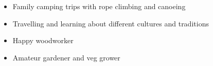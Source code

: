 \documentclass[10pt,a4paper,ragged2e,withhyper]{altacv}
\begin{document}
\begin{paracol}{2}


\divider



\begin{itemize}
    \item Family camping trips with rope climbing and canoeing
    
    \item Travelling and learning about different cultures and traditions

    \item Happy woodworker

    \item Amateur gardener and veg grower
\end{itemize}


\end{paracol}

\end{document}
